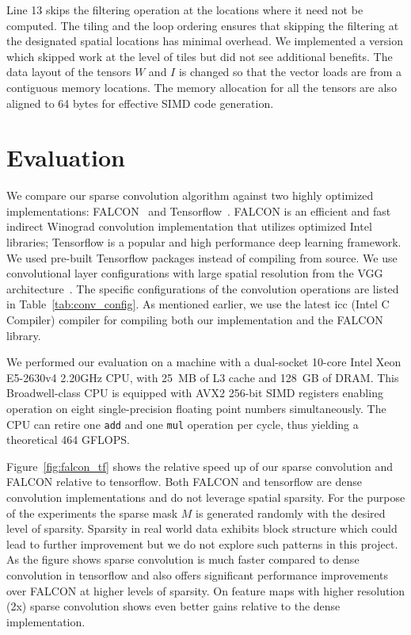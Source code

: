 \documentclass{article}
\begin{document}
Line 13 skips the filtering operation at the locations where it need not be
computed. The tiling and the loop ordering ensures that skipping the filtering
at the designated spatial locations has minimal overhead. We implemented a
version which skipped work at the level of tiles but did not see additional
benefits. The data layout of the tensors $W$ and $I$ is changed so that the
vector loads are from a contiguous memory locations. The memory allocation for
all the tensors are also aligned to 64 bytes for effective SIMD code generation.

\section{Evaluation}
We compare our sparse convolution algorithm against two highly optimized
implementations: FALCON~\cite{falcon} and Tensorflow~\cite{tensorflow}.  FALCON
is an efficient and fast indirect Winograd convolution implementation that
utilizes optimized Intel libraries; Tensorflow is a popular and high performance
deep learning framework. We used pre-built Tensorflow packages instead of
compiling from source. We use convolutional layer configurations with large
spatial resolution from the VGG architecture~\cite{simonyan2014very}.  The
specific configurations of the convolution operations are listed in
Table~\ref{tab:conv_config}. As mentioned earlier, we use the latest icc (Intel
C Compiler) compiler for compiling both our implementation and the FALCON
library. 

We performed our evaluation on a machine with a dual-socket 10-core Intel 
Xeon E5-2630v4 2.20GHz CPU, with 25~MB of L3 cache and 128~GB of DRAM. This 
Broadwell-class CPU is equipped with AVX2 256-bit SIMD registers enabling
operation on eight single-precision floating point numbers simultaneously. 
The CPU can retire one \texttt{add} and one \texttt{mul} operation per cycle,
thus yielding a theoretical 464 GFLOPS.

Figure~\ref{fig:falcon_tf} shows the relative speed up of our sparse convolution
and FALCON relative to tensorflow. Both FALCON and tensorflow are dense
convolution implementations and do not leverage spatial sparsity. For the
purpose of the experiments the sparse mask $M$ is generated randomly with the
desired level of sparsity. Sparsity in real world data exhibits block structure
which could lead to further improvement but we do not explore such patterns in
this project. As the figure shows sparse convolution is much faster compared to
dense convolution in tensorflow and also offers significant performance
improvements over FALCON at higher levels of sparsity. On feature maps with
higher resolution (2x) sparse convolution shows even better gains relative to
the dense implementation.
\end{document}
